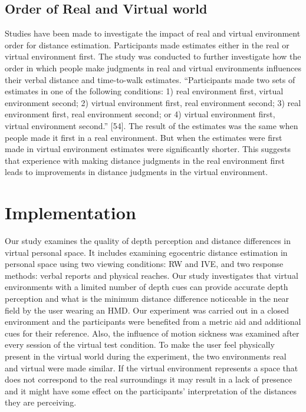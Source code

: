 \section{Order of Real and Virtual world}
Studies have been made to investigate the impact of real and virtual environment order for distance estimation. Participants made estimates either in the real or virtual environment first. The study was conducted to further investigate how the order in which people make judgments in real and virtual environments influences their verbal distance and time-to-walk estimates. “Participants made two sets of estimates in one of the following conditions: 1) real environment first, virtual environment second; 2) virtual environment first, real environment second; 3) real environment first, real environment second; or 4) virtual environment first, virtual environment second.” [54]. The result of the estimates was the same when people made it first in a real environment. But when the estimates were first made in virtual environment estimates were significantly shorter. This suggests that experience with making distance judgments in the real environment first leads to improvements in distance judgments in the virtual environment. 


\chapter{Implementation}
\label{sec:Implementation}
Our study examines the quality of depth perception and distance differences in virtual personal space. It includes examining egocentric distance estimation in personal space using two viewing conditions: RW and IVE, and two response methods: verbal reports and physical reaches. Our study investigates that virtual environments with a limited number of depth cues can provide accurate depth perception and what is the minimum distance difference noticeable in the near field by the user wearing an HMD. Our experiment was carried out in a closed environment and the participants were benefited from a metric aid and additional cues for their reference. Also, the influence of motion sickness was examined after every session of the virtual test condition. To make the user feel physically present in the virtual world during the experiment, the two environments real and virtual were made similar. If the virtual environment represents a space that does not correspond to the real surroundings it may result in a lack of presence and it might have some effect on the participants' interpretation of the distances they are perceiving. 
 

